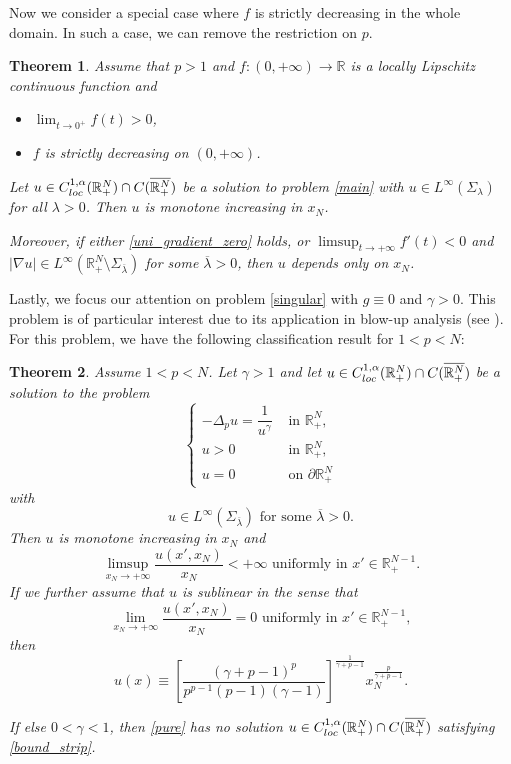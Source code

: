 \documentclass[reqno]{amsart}
\theoremstyle{plain}
\newtheorem{theorem}{Theorem}
\theoremstyle{definition}
\theoremstyle{remark}
\begin{document}
	Now we consider a special case where $f$ is strictly decreasing in the whole domain. In such a case, we can remove the restriction on $p$.
	\begin{theorem}\label{th:decreasing}
		Assume that $p>1$ and $f:(0,+\infty)\to\mathbb{R}$ is a locally Lipschitz continuous function and
		\begin{itemize}
			\item[(i)] $\lim_{t\to0^+} f(t) > 0$,
			\item[(ii)] $f$ is strictly decreasing on $(0,+\infty)$.
		\end{itemize}
		Let $u \in C^{1,\alpha}_{\rm loc}(\mathbb{R}^N_+) \cap C(\overline{\mathbb{R}^N_+})$ be a solution to problem \eqref{main} with $u\in L^\infty(\Sigma_\lambda)$ for all $\lambda>0$.
		Then $u$ is monotone increasing in $x_N$.
		
		Moreover, if either \eqref{uni_gradient_zero} holds, or $\limsup_{t\to+\infty} f'(t) < 0$ and $|\nabla u| \in L^\infty(\mathbb{R}^N_+\setminus\Sigma_{\overline\lambda})$ for some $\overline\lambda>0$, then $u$ depends only on $x_N$.
	\end{theorem}
	Lastly, we focus our attention on problem \eqref{singular} with $g\equiv0$ and $\gamma>0$. This problem is of particular interest due to its application in blow-up analysis (see \cite{MR4044739}). For this problem, we have the following classification result for $1<p<N$:
	\begin{theorem}\label{th:pure}
		Assume $1<p< N$. Let $\gamma>1$ and let $u \in C^{1,\alpha}_{\rm loc}(\mathbb{R}^N_+) \cap C(\overline{\mathbb{R}^N_+})$ be a solution to the problem
		\begin{equation}\label{pure}
			\begin{cases}
				-\Delta_p u = \dfrac{1}{u^\gamma} & \text{ in } \mathbb{R}^N_+,\\
				u>0 & \text{ in } \mathbb{R}^N_+,\\
				u=0 & \text{ on } \partial\mathbb{R}^N_+
			\end{cases}
		\end{equation}
		with
		\begin{equation}\label{bound_strip}
			u\in L^\infty(\Sigma_{\overline\lambda}) \text{ for some } \overline\lambda>0.
		\end{equation}
		Then $u$ is monotone increasing in $x_N$ and
		\begin{equation}\label{asymptotic}
			\limsup_{x_N\to+\infty} \frac{u(x',x_N)}{x_N}<+\infty \text{ uniformly in } x'\in\mathbb{R}^{N-1}_+.
		\end{equation}
		If we further assume that $u$ is sublinear in the sense that	
		\begin{equation}\label{sublinear}
			\lim_{x_N\to+\infty} \frac{u(x',x_N)}{x_N}=0 \text{ uniformly in } x'\in\mathbb{R}^{N-1}_+,
		\end{equation}
		then
		\[
		u(x) \equiv \left[\frac{(\gamma+p-1)^p}{p^{p-1}(p-1)(\gamma-1)}\right]^\frac{1}{\gamma+p-1}	x_N^\frac{p}{\gamma+p-1}.
		\]
		
		If else $0<\gamma<1$, then \eqref{pure} has no solution $u \in C^{1,\alpha}_{\rm loc}(\mathbb{R}^N_+) \cap C(\overline{\mathbb{R}^N_+})$ satisfying \eqref{bound_strip}.
	\end{theorem}
\end{document}
